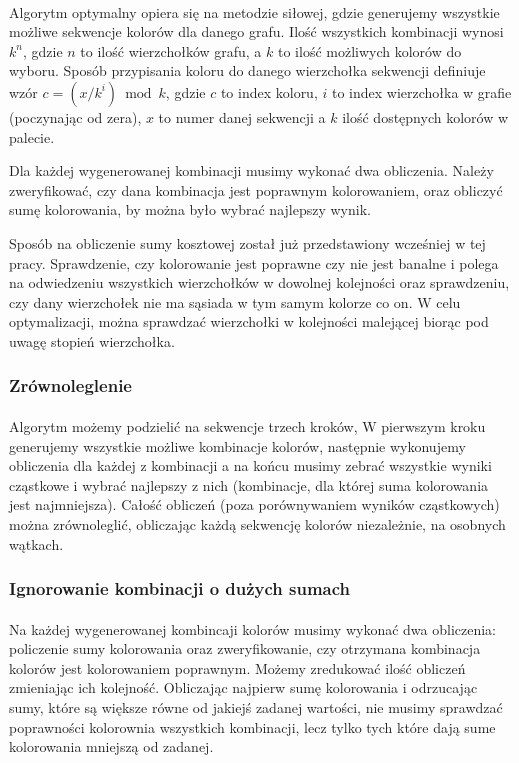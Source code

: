 \documentclass{article}
\begin{document}
\paragraph{} Algorytm optymalny opiera się na metodzie siłowej, gdzie generujemy wszystkie możliwe sekwencje kolorów dla danego grafu. Ilość wszystkich kombinacji wynosi $k^n$, gdzie $n$ to ilość wierzchołków grafu, a $k$ to ilość możliwych kolorów do wyboru. Sposób przypisania koloru do danego wierzchołka sekwencji definiuje wzór $c = (x / k^{i}) \bmod k$, gdzie $c$ to index koloru, $i$ to index wierzchołka w grafie (poczynając od zera), $x$ to numer danej sekwencji a $k$ ilość dostępnych kolorów w palecie. 

Dla każdej wygenerowanej kombinacji musimy wykonać dwa obliczenia. Należy zweryfikować, czy dana kombinacja jest poprawnym kolorowaniem, oraz obliczyć sumę kolorowania, by można było wybrać najlepszy wynik.

Sposób na obliczenie sumy kosztowej został już przedstawiony wcześniej w tej pracy. Sprawdzenie, czy kolorowanie jest poprawne czy nie jest banalne i polega na odwiedzeniu wszystkich wierzchołków w dowolnej kolejności oraz sprawdzeniu, czy dany wierzchołek nie ma sąsiada w tym samym kolorze co on. W celu optymalizacji, można sprawdzać wierzchołki w kolejności malejącej biorąc pod uwagę stopień wierzchołka.

\subsubsection*{Zrównoleglenie}

\paragraph{} Algorytm możemy podzielić na sekwencje trzech kroków, W pierwszym kroku generujemy wszystkie możliwe kombinacje kolorów, następnie wykonujemy obliczenia dla każdej z kombinacji a na końcu musimy zebrać wszystkie wyniki cząstkowe i wybrać najlepszy z nich (kombinacje, dla której suma kolorowania jest najmniejsza). Całość obliczeń (poza porównywaniem wyników cząstkowych) można zrównoleglić, obliczając każdą sekwencję kolorów niezależnie, na osobnych wątkach.

\subsubsection*{Ignorowanie kombinacji o dużych sumach}

\paragraph{} Na każdej wygenerowanej kombincaji kolorów musimy wykonać dwa obliczenia: policzenie sumy kolorowania oraz zweryfikowanie, czy otrzymana kombinacja kolorów jest kolorowaniem poprawnym. Możemy zredukować ilość obliczeń zmieniając ich kolejność. Obliczając najpierw sumę kolorowania i odrzucając sumy, które są większe równe od jakiejś zadanej wartości, nie musimy sprawdzać poprawności kolorownia wszystkich kombinacji, lecz tylko tych które dają sume kolorowania mniejszą od zadanej.
\end{document}

